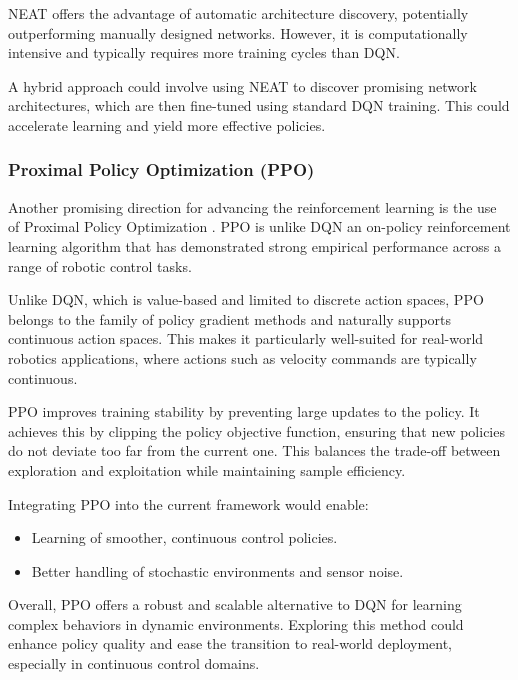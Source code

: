 NEAT offers the advantage of automatic architecture discovery, potentially outperforming manually designed networks. However, it is computationally intensive and typically requires more training cycles than DQN.

A hybrid approach could involve using NEAT to discover promising network architectures, which are then fine-tuned using standard DQN training. This could accelerate learning and yield more effective policies.

\subsubsection{Proximal Policy Optimization (PPO)}
Another promising direction for advancing the reinforcement learning is the use of Proximal Policy Optimization \cite{ppo}. PPO is unlike DQN an on-policy reinforcement learning algorithm that has demonstrated strong empirical performance across a range of robotic control tasks.

Unlike DQN, which is value-based and limited to discrete action spaces, PPO belongs to the family of policy gradient methods and naturally supports continuous action spaces. This makes it particularly well-suited for real-world robotics applications, where actions such as velocity commands are typically continuous.

PPO improves training stability by preventing large updates to the policy. It achieves this by clipping the policy objective function, ensuring that new policies do not deviate too far from the current one. This balances the trade-off between exploration and exploitation while maintaining sample efficiency.

Integrating PPO into the current framework would enable:
\begin{itemize}
  \item Learning of smoother, continuous control policies.
  \item Better handling of stochastic environments and sensor noise.
\end{itemize}

Overall, PPO offers a robust and scalable alternative to DQN for learning complex behaviors in dynamic environments. Exploring this method could enhance policy quality and ease the transition to real-world deployment, especially in continuous control domains.
